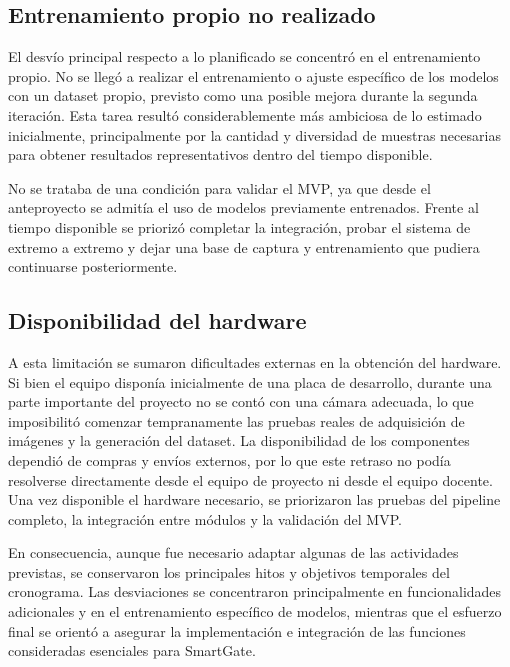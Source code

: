 \subsection{Entrenamiento propio no realizado}

El desvío principal respecto a lo planificado se concentró en el entrenamiento propio. No se llegó a realizar el entrenamiento o ajuste específico de los modelos con un dataset propio, previsto como una posible mejora durante la segunda iteración. Esta tarea resultó considerablemente más ambiciosa de lo estimado inicialmente, principalmente por la cantidad y diversidad de muestras necesarias para obtener resultados representativos dentro del tiempo disponible.

No se trataba de una condición para validar el MVP, ya que desde el anteproyecto se admitía el uso de modelos previamente entrenados. Frente al tiempo disponible se priorizó completar la integración, probar el sistema de extremo a extremo y dejar una base de captura y entrenamiento que pudiera continuarse posteriormente.

\subsection{Disponibilidad del hardware}

A esta limitación se sumaron dificultades externas en la obtención del hardware. Si bien el equipo disponía inicialmente de una placa de desarrollo, durante una parte importante del proyecto no se contó con una cámara adecuada, lo que imposibilitó comenzar tempranamente las pruebas reales de adquisición de imágenes y la generación del dataset. La disponibilidad de los componentes dependió de compras y envíos externos, por lo que este retraso no podía resolverse directamente desde el equipo de proyecto ni desde el equipo docente. Una vez disponible el hardware necesario, se priorizaron las pruebas del pipeline completo, la integración entre módulos y la validación del MVP.

En consecuencia, aunque fue necesario adaptar algunas de las actividades previstas, se conservaron los principales hitos y objetivos temporales del cronograma. Las desviaciones se concentraron principalmente en funcionalidades adicionales y en el entrenamiento específico de modelos, mientras que el esfuerzo final se orientó a asegurar la implementación e integración de las funciones consideradas esenciales para SmartGate.
